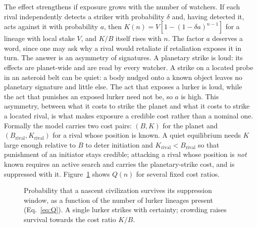 \documentclass[preprint,12pt]{elsarticle}
\theoremstyle{definition}
\begin{document}
The effect strengthens if exposure grows with the number of watchers. If each rival independently detects a striker with probability $\delta$ and, having detected it, acts against it with probability $a$, then $K(n) = V[1 - (1-\delta a)^{n-1}]$ for a lineage with local stake $V$, and $K/B$ itself rises with $n$. The factor $a$ deserves a word, since one may ask why a rival would retaliate if retaliation exposes it in turn. The answer is an asymmetry of signatures. A planetary strike is loud: its effects are planet-wide and are read by every watcher. A strike on a located probe in an asteroid belt can be quiet: a body nudged onto a known object leaves no planetary signature and little else. The act that exposes a lurker is loud, while the act that punishes an exposed lurker need not be, so $a$ is high. This asymmetry, between what it costs to strike the planet and what it costs to strike a located rival, is what makes exposure a credible cost rather than a nominal one. Formally the model carries two cost pairs: $(B, K)$ for the planet and $(B_{\mathrm{rival}}, K_{\mathrm{rival}})$ for a rival whose position is known. A quiet equilibrium needs $K$ large enough relative to $B$ to deter initiation and $K_{\mathrm{rival}} < B_{\mathrm{rival}}$ so that punishment of an initiator stays credible; attacking a rival whose position is \emph{not} known requires an active search and carries the planetary-strike cost, and is suppressed with it. Figure~\ref{fig:Q} shows $Q(n)$ for several fixed cost ratios.

\begin{figure}[!htbp]
\centering
{}
\caption{Probability that a nascent civilization survives its suppression window, as a function of the number of lurker lineages present (Eq.~\ref{eq:Q}). A single lurker strikes with certainty; crowding raises survival towards the cost ratio $K/B$.}
\label{fig:Q}
\end{figure}
\end{document}
